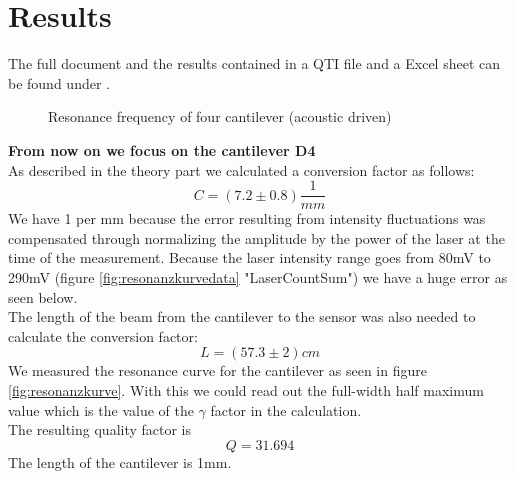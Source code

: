 \documentclass[12pt,a4paper]{article}
\begin{document}
\section{Results}
The full document and the results contained in a QTI file and a Excel sheet can be found under \cite{github}.
\begin{figure}[H]
 \centering
 \caption{Resonance frequency of four cantilever (acoustic driven)}
 \label{tab:acoustic_resonance}
\end{figure}
\textbf{From now on we focus on the cantilever D4}\\
As described in the theory part we calculated a conversion factor as follows:
$$C = (7.2 \pm 0.8) \frac{1}{mm}$$
We have 1 per mm because the error resulting from intensity fluctuations was compensated through normalizing the amplitude by the power of the laser at the time of the measurement. Because the laser intensity range goes from 80mV to 290mV (figure \ref{fig:resonanzkurvedata} "LaserCountSum") we have a huge error as seen below.\\
The length of the beam from the cantilever to the sensor was also needed to calculate the conversion factor:
$$L = (57.3 \pm 2)cm$$
We measured the resonance curve for the cantilever as seen in figure \ref{fig:resonanzkurve}.
With this we could read out the full-width half maximum value which is the value of the $\gamma$ factor in the calculation.\\

The resulting quality factor is
$$Q = 31.694$$
The length of the cantilever is 1mm.
\end{document}
